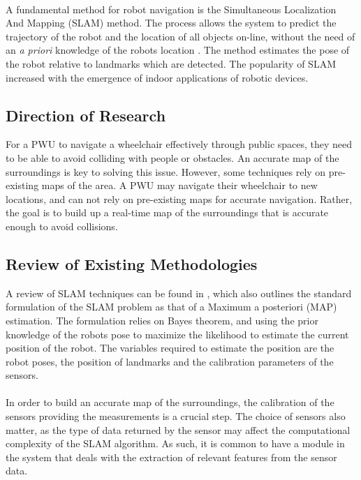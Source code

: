 \paragraph{}A fundamental method for robot navigation is the Simultaneous Localization And Mapping (SLAM) method. The process allows the system to predict the trajectory of the robot and the location of all objects on-line, without the need of an \textit{a priori} knowledge of the robots location \citep{Bailey2006a}. The method estimates the pose of the robot relative to landmarks which are detected. The popularity of SLAM increased with the emergence of indoor applications of robotic devices.

\subsection{Direction of Research}
For a PWU to navigate a wheelchair effectively through public spaces, they need to be able to avoid colliding with people or obstacles. An accurate map of the surroundings is key to solving this issue. However, some techniques rely on pre-existing maps of the area. A PWU may navigate their wheelchair to new locations, and can not rely on pre-existing maps for accurate navigation. Rather, the goal is to build up a real-time map of the surroundings that is accurate enough to avoid collisions.

\subsection{Review of Existing Methodologies}
A review of SLAM techniques can be found in \cite{Cadena2016}, which also outlines the standard formulation of the SLAM problem as that of a Maximum a posteriori (MAP) estimation. The formulation relies on Bayes theorem, and using the prior knowledge of the robots pose to maximize the likelihood to estimate the current position of the robot. The variables required to estimate the position are the robot poses, the position of landmarks and the calibration parameters of the sensors.

\paragraph{}In order to build an accurate map of the surroundings, the calibration of the sensors providing the measurements is a crucial step. The choice of sensors also matter, as the type of data returned by the sensor may affect the computational complexity of the SLAM algorithm. As such, it is common to have a module in the system that deals with the extraction of relevant features from the sensor data.

